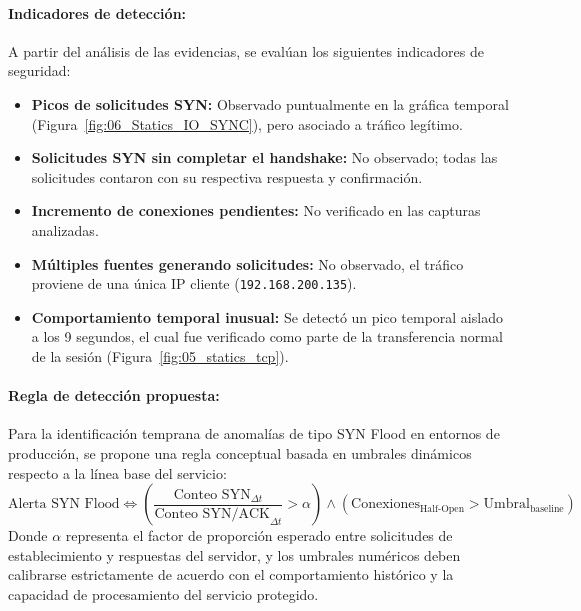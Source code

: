 \paragraph{Indicadores de detección:}
A partir del análisis de las evidencias, se evalúan los siguientes indicadores de seguridad:
\begin{itemize}
    \item \textbf{Picos de solicitudes SYN:} Observado puntualmente en la gráfica temporal (Figura~\ref{fig:06_Statics_IO_SYNC}), pero asociado a tráfico legítimo.
    \item \textbf{Solicitudes SYN sin completar el handshake:} No observado; todas las solicitudes contaron con su respectiva respuesta y confirmación.
    \item \textbf{Incremento de conexiones pendientes:} No verificado en las capturas analizadas.
    \item \textbf{Múltiples fuentes generando solicitudes:} No observado, el tráfico proviene de una única IP cliente (\texttt{192.168.200.135}).
    \item \textbf{Comportamiento temporal inusual:} Se detectó un pico temporal aislado a los 9 segundos, el cual fue verificado como parte de la transferencia normal de la sesión (Figura~\ref{fig:05_statics_tcp}).
\end{itemize}

\paragraph{Regla de detección propuesta:}
Para la identificación temprana de anomalías de tipo SYN Flood en entornos de producción, se propone una regla conceptual basada en umbrales dinámicos respecto a la línea base del servicio:
\begin{equation*}
    \text{Alerta SYN Flood} \iff \left( \frac{\text{Conteo SYN}_{\Delta t}}{\text{Conteo SYN/ACK}_{\Delta t}} > \alpha \right) \land \left( \text{Conexiones}_{\text{Half-Open}} > \text{Umbral}_{\text{baseline}} \right)
\end{equation*}
Donde $\alpha$ representa el factor de proporción esperado entre solicitudes de establecimiento y respuestas del servidor, y los umbrales numéricos deben calibrarse estrictamente de acuerdo con el comportamiento histórico y la capacidad de procesamiento del servicio protegido. \newline

